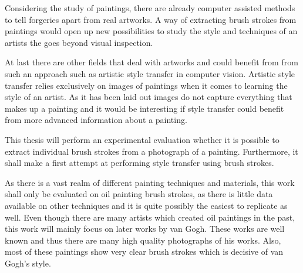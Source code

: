 Considering the study of paintings, there are already computer assisted methods to
tell forgeries apart from real artworks.
A way of extracting brush strokes from paintings would open up new possibilities to
study the style and techniques of an artists the goes beyond visual inspection.

At last there are other fields that deal with artworks and could benefit from from such
an approach such as artistic style transfer in computer vision.
Artistic style transfer relies exclusively on images of paintings when it comes to
learning the style of an artist.
As it has been laid out images do not capture everything that makes up a painting
and it would be interesting if style transfer could benefit from more advanced information
about a painting.

This thesis will perform an experimental evaluation whether it is possible to extract
individual brush strokes from a photograph of a painting.
Furthermore, it shall make a first attempt at performing style transfer using
brush strokes.

As there is a vast realm of different painting techniques and materials, this work
shall only be evaluated on oil painting brush strokes, as there is little data available
on other techniques and it is quite possibly the easiest to replicate as well.
Even though there are many artists which created oil paintings in the past, this work
will mainly focus on later works by van Gogh.
These works are well known and thus there are many high quality photographs of his works.
Also, most of these paintings show very clear brush strokes which is decisive of
van Gogh's style.


